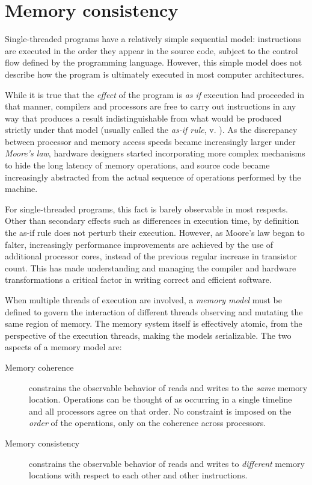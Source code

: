 \section{Memory consistency}

\label{sec:conc:consistency}

Single-threaded programs have a relatively simple sequential model: instructions
are executed in the order they appear in the source code, subject to the control
flow defined by the programming language.  However, this simple model does not
describe how the program is ultimately executed in most computer architectures.

While it is true that the \emph{effect} of the program is \emph{as if} execution
had proceeded in that manner, compilers and processors are free to carry out
instructions in any way that produces a result indistinguishable from what would
be produced strictly under that model (usually called the \textit{as-if rule},
v. \cite{cppref_asif}).  As the discrepancy between processor and memory access
speeds became increasingly larger under \textit{Moore's law}, hardware designers
started incorporating more complex mechanisms to hide the long latency of memory
operations, and source code became increasingly abstracted from the actual
sequence of operations performed by the machine.

For single-threaded programs, this fact is barely observable in most respects.
Other than secondary effects such as differences in execution time, by
definition the as-if rule does not perturb their execution.  However, as Moore's
law began to falter, increasingly performance improvements are achieved by the
use of additional processor cores, instead of the previous regular increase in
transistor count.  This has made understanding and managing the compiler and
hardware transformations a critical factor in writing correct and efficient
software.

When multiple threads of execution are involved, a \textit{memory model} must be
defined to govern the interaction of different threads observing and mutating
the same region of memory.  The memory system itself is effectively atomic, from
the perspective of the execution threads, making the models serializable.  The
two aspects of a memory model are:

\begin{description}
    \item[Memory coherence]
        constrains the observable behavior of reads and writes to the
        \emph{same} memory location.  Operations can be thought of as occurring
        in a single timeline and all processors agree on that order.  No
        constraint is imposed on the \emph{order} of the operations, only on the
        coherence across processors.
    \item[Memory consistency]
        constrains the observable behavior of reads and writes to
        \emph{different} memory locations with respect to each other and other
        instructions.
\end{description}

